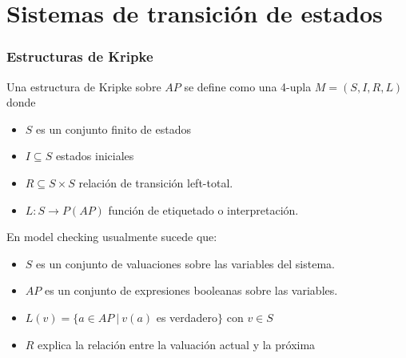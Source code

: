 \documentclass[serif]{beamer}
\begin{document}


\section[Teoría]{Sistemas de transición de estados}

\begin{frame}
\frametitle{Estructuras de Kripke}
Una estructura de Kripke sobre $AP$ se define
como una 4-upla $M = (S, I, R, L)$ donde\\[0.5cm]
\begin{itemize}
\item $S$ es un conjunto finito de estados
\item $I \subseteq S$ estados iniciales
\item $R \subseteq S \times S$ relación de transición left-total.
\item $L: S \rightarrow P(AP)$ función de etiquetado o interpretación.
\end{itemize}
\end{frame}

\begin{frame}

En model checking usualmente sucede que:\\[0.5cm]
\begin{itemize}
\item $S$ es un conjunto de valuaciones sobre las variables del sistema.
\item $AP$ es un conjunto de expresiones booleanas sobre las variables.
\item $L(v) = \lbrace a \in AP~|~v(a)$ es verdadero$\rbrace$ con $v \in S$
\item $R$ explica la relación entre la valuación actual y la próxima
\end{itemize}

\end{frame}
\end{document}
